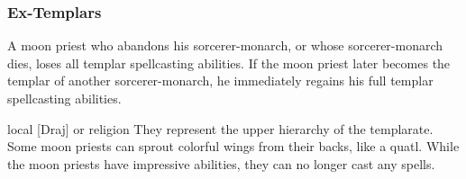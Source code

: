 {\subsubsection{Ex-Templars}
A moon priest who abandons his sorcerer-monarch, or whose sorcerer-monarch dies, loses all templar spellcasting abilities. If the moon priest later becomes the templar of another sorcerer-monarch, he immediately regains his full templar spellcasting abilities.
}
{}
{local [Draj] or religion}
{They represent the upper hierarchy of the templarate.}
{Some moon priests can sprout colorful wings from their backs, like a quatl.}
{While the moon priests have impressive abilities, they can no longer cast any spells.}